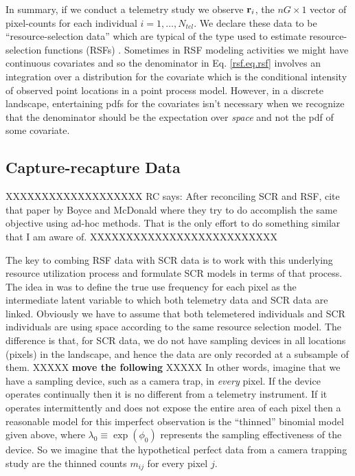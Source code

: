 In summary, if we conduct a telemetry study we observe ${\bf r}_{i}$,
the $nG \times 1$ vector of pixel-counts for each individual
$i=1,\ldots,N_{tel}$.  We declare these data to be
``resource-selection data'' which are typical of the type used to
estimate resource-selection functions (RSFs) \citep{manly_etal:2002}.
Sometimes in RSF modeling activities we might have
continuous covariates and so the denominator in Eq. \ref{rsf.eq.rsf}
involves an integration over a distribution for the covariate which is
the conditional intensity of observed point locations in a point
process model. However, in a discrete landscape, entertaining pdfs for
the covariates isn't necessary \citep{royle_etal:2012mee} when we
recognize that the denominator should be the expectation over {\it
  space} and not the pdf of some covariate.


\subsection{Capture-recapture Data}

XXXXXXXXXXXXXXXXXXX
RC says: After reconciling SCR and RSF, cite that paper
by Boyce and McDonald where they try to do accomplish the same
objective using ad-hoc methods. That is the only effort to do
something similar that I am aware of.
XXXXXXXXXXXXXXXXXXXXXXXXXX

The key to combing RSF data with SCR data is to work with this
underlying resource utilization process and formulate SCR models in
terms of that process. The idea in \citep{royle_etal:xxxxx} was to
define the true use frequency for each pixel as 
the intermediate latent variable to which both telemetry data and SCR
data are linked.
Obviously we have to assume that both telemetered individuals
and SCR individuals are using space according to the same resource
selection model. The difference is that, for SCR data, we do not have
sampling devices in all locations (pixels) in the landscape, and hence
the data are only recorded at a subsample of them. XXXXX {\bf move the
  following } XXXXX
In other words,
imagine that we have a sampling device, such as a camera trap, in {\it
  every} pixel. If the device operates continually then it is no
different from a telemetry instrument.  If it operates intermittently
and does not expose the entire area of each pixel then a reasonable
model for this imperfect observation is the ``thinned'' binomial model
given above, where $\lambda_{0} \equiv \exp(\phi_{0})$ represents the
sampling effectiveness of the device. So we imagine that the
hypothetical perfect data from a camera trapping study are the thinned
counts $m_{ij}$ for every pixel $j$.

